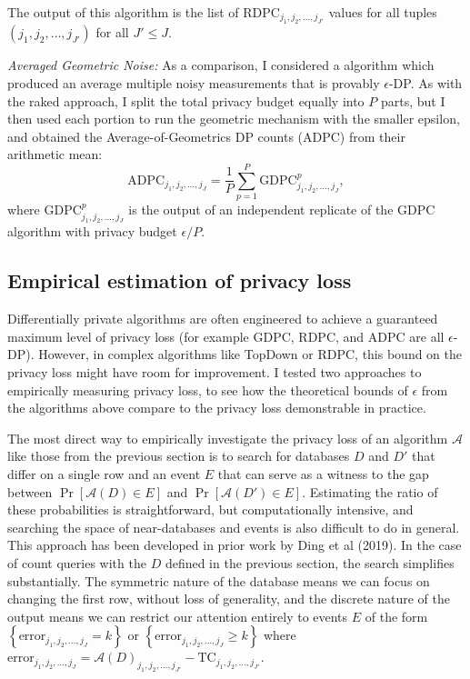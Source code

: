 \documentclass{article}
\begin{document}
The output of this algorithm is the list of $
\mathrm{RDPC}_{j_1, j_2, \ldots, j_{J'}}$ values for all tuples $(j_1, j_2, \ldots, j_{J'})$ for all $J' \leq J$.

\emph{Averaged Geometric Noise:} As a comparison, I considered a algorithm which produced an average multiple noisy measurements that is provably $\epsilon$-DP.  As with the raked approach, I split the total privacy budget equally into $P$ parts, but I then used each portion to run the geometric mechanism with the smaller epsilon, and obtained the Average-of-Geometrics DP counts (ADPC) from their arithmetic mean:
$$
\mathrm{ADPC}_{j_1,j_2,\ldots, j_{J}} =
\frac{1}{P}\sum_{p=1}^P
\mathrm{GDPC}_{j_1, j_2, \ldots, j_{J}}^p,
$$
where $\mathrm{GDPC}_{j_1, j_2, \ldots, j_{J}}^p$ is the output of an independent replicate of the GDPC algorithm with privacy budget $\epsilon/P$.

\subsection{Empirical estimation of privacy loss}
Differentially private algorithms are often engineered to achieve a guaranteed maximum level of privacy loss (for example GDPC, RDPC, and ADPC are all $\epsilon$-DP).  However, in complex algorithms like TopDown or RDPC, this bound on the privacy loss might have room for improvement.  I tested two approaches to empirically measuring privacy loss, to see how the theoretical bounds of $\epsilon$ from the algorithms above compare to the privacy loss demonstrable in practice.

The most direct way to empirically investigate the privacy loss of an algorithm $\mathcal{A}$ like those from the previous section is to search for databases $D$ and $D'$ that differ on a single row and an event $E$ that can serve as a witness to the gap between $\Pr[\mathcal{A}(D) \in E]$ and $\Pr[\mathcal{A}(D') \in E]$.  Estimating the ratio of these probabilities is straightforward, but computationally intensive, and searching the space of near-databases and events is also difficult to do in general.  This approach has been developed in prior work by Ding et al (2019).\cite{ding2018detecting}  In the case of count queries with the $D$ defined in the previous section, the search simplifies substantially.  The symmetric nature of the database means we can focus on changing the first row, without loss of generality, and the discrete nature of the output means we can restrict our attention entirely to events $E$ of the form $\left\{\mathrm{error}_{j_1, j_2, \ldots, j_{J}}
= k\right\}$ or $\left\{\mathrm{error}_{j_1, j_2, \ldots, j_{J}} \geq k\right\}$ where $\mathrm{error}_{j_1, j_2, \ldots, j_{J}} = \mathcal{A}(D)_{j_1, j_2, \ldots, j_{J'}}
- \mathrm{TC}_{j_1, j_2, \ldots, j_{J'}}$.
\end{document}
